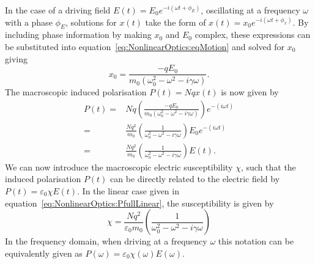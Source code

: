 In the case of a driving field $E(t) = E_0 e^{-i(\omega t + \phi_E)}$, oscillating at a frequency $\omega$ with a phase $\phi_E$, solutions for $x(t)$ take the form of $x(t) = x_0 e^{-i(\omega t + \phi_x)}$. By including phase information by making $x_0$ and $E_0$ complex, these expressions can be substituted into equation~\ref{eq:NonlinearOptics:eqMotion} and solved for $x_0$ giving
\begin{equation}\label{eq:NonlinearOptics:x0}
	x_0 = \frac{-q E_0}{m_0 (\omega_{0}^2 -\omega^2 -i \gamma \omega)}.
\end{equation}
The macroscopic induced polarisation $P(t) = N q x(t)$ is now given by
\begin{equation}\label{eq:NonlinearOptics:PfullLinear}
	\begin{split}
		P(t) = & N q \left( \frac{-q E_0}{m_0 (\omega_{0}^2 -\omega^2 -i \gamma \omega)} \right) e^{-(i\omega t)} \\
		= & \frac{N q^2}{m_0} \left( \frac{1}{\omega_{0}^2 -\omega^2 -i \gamma \omega} \right) E_0 e^{-(i\omega t)} \\
		= & \frac{N q^2}{m_0} \left( \frac{1}{\omega_{0}^2 -\omega^2 -i \gamma \omega} \right) E(t).
	\end{split}
\end{equation}
We can now introduce the macroscopic electric susceptibility $\chi$, such that the induced polarisation $P(t)$ can be directly related to the electric field by $P(t) = \varepsilon_0 \chi E(t)$. In the linear case given in equation~\ref{eq:NonlinearOptics:PfullLinear}, the susceptibility is given by
\begin{equation}\label{eq:NonlinearOptics:chiFullLinear}
		\chi = \frac{N q^2}{\varepsilon_0 m_0} \left( \frac{1}{\omega_{0}^2 -\omega^2 -i \gamma \omega} \right)
\end{equation}
In the frequency domain, when driving at a frequency $\omega$ this notation can be equivalently given as $P(\omega) = \varepsilon_0 \chi(\omega) E(\omega)$.

